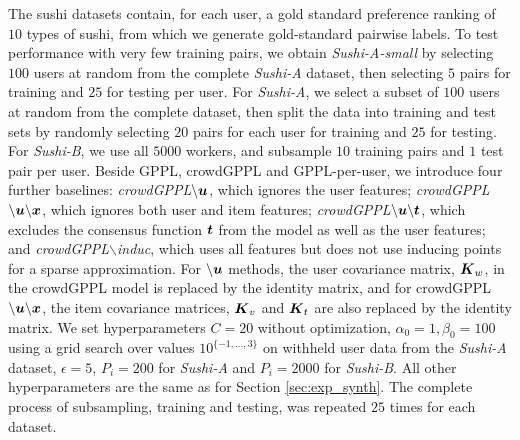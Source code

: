 The sushi datasets contain, for each user, a gold standard preference ranking 
of $10$ types of sushi,
from which we generate gold-standard pairwise labels. 
To test performance with very few training pairs, we obtain \emph{Sushi-A-small}
by selecting $100$ users at random from the complete \emph{Sushi-A} dataset,
then selecting $5$ pairs for training and $25$ for testing per user.
For \emph{Sushi-A}, we select a subset of $100$ users at random from the complete dataset, then 
split the data into training and test sets by randomly
selecting $20$ pairs for each user for training and $25$ for testing. 
For \emph{Sushi-B}, we use all $5000$ workers, and subsample $10$ training pairs and $1$ test pair per user.
Beside GPPL, crowdGPPL and GPPL-per-user, we 
introduce four further baselines: 
\emph{crowdGPPL$\mathbf{\backslash \boldsymbol u}$}, which ignores the user features;
 \emph{crowdGPPL$\mathbf{\backslash \boldsymbol u \backslash \boldsymbol x}$}, which ignores both user and item features;
 \emph{crowdGPPL$\mathbf{\backslash \boldsymbol u \backslash \boldsymbol t}$}, which 
excludes the consensus function $\boldsymbol t$ from the model as well as the user
features;
and  \emph{crowdGPPL$\backslash$induc}, which uses all features but does 
not use inducing points for a sparse approximation.
For $\backslash\boldsymbol u$ methods, the user covariance matrix, $\boldsymbol K_w$, in the crowdGPPL model is replaced by the identity matrix, and for crowdGPPL$\mathbf{\backslash \boldsymbol u \backslash \boldsymbol x}$, the item covariance matrices, $\boldsymbol K_v$ and $\boldsymbol K_t$ are also replaced by the identity matrix.
We set hyperparameters $C=20$ without optimization,
$\alpha_0=1, \beta_0=100$ using a grid search over values 
$10^{\{-1,...,3\}}$ on withheld user data from the \emph{Sushi-A} dataset,
$\epsilon=5$, $P_i=200$ for \emph{Sushi-A} and $P_i=2000$ for \emph{Sushi-B}. All other hyperparameters are the same 
as for Section \ref{sec:exp_synth}.
The complete process of subsampling, training and testing, was repeated $25$ times
for each dataset.

